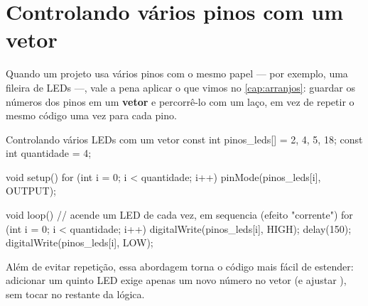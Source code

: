\section{Controlando vários pinos com um vetor}

Quando um projeto usa vários pinos com o mesmo papel — por exemplo, uma fileira de LEDs —, vale a pena aplicar o que vimos no \cref{cap:arranjos}: guardar os números dos pinos em um \textbf{vetor} e percorrê-lo com um laço, em vez de repetir o mesmo código uma vez para cada pino.

\begin{codigoc}{Controlando vários LEDs com um vetor}
const int pinos_leds[] = {2, 4, 5, 18};
const int quantidade = 4;

void setup() {
    for (int i = 0; i < quantidade; i++) {
        pinMode(pinos_leds[i], OUTPUT);
    }
}

void loop() {
    // acende um LED de cada vez, em sequencia (efeito "corrente")
    for (int i = 0; i < quantidade; i++) {
        digitalWrite(pinos_leds[i], HIGH);
        delay(150);
        digitalWrite(pinos_leds[i], LOW);
    }
}
\end{codigoc}

Além de evitar repetição, essa abordagem torna o código mais fácil de estender: adicionar um quinto LED exige apenas um novo número no vetor  (e ajustar ), sem tocar no restante da lógica.
